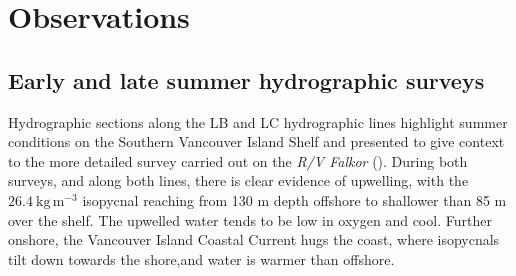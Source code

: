 \documentclass[draft]{agujournal2019}
\begin{document}
\section{Observations}
\label{sec:Observations}

\subsection{Early and late summer hydrographic surveys}

Hydrographic sections along the LB and LC hydrographic lines highlight summer conditions on the Southern Vancouver Island Shelf and presented to give context to the more detailed survey carried out on the \emph{R/V Falkor} ().  During both surveys, and along both lines, there is clear evidence of upwelling, with the $26.4\ \mathrm{kg\,m^{-3}}$ isopycnal reaching from 130 m depth offshore to shallower than 85 m over the shelf.  The upwelled water tends to be low in oxygen and cool. Further onshore, the Vancouver Island Coastal Current hugs the coast, where isopycnals tilt down towards the shore,and water is warmer than offshore.
\end{document}
